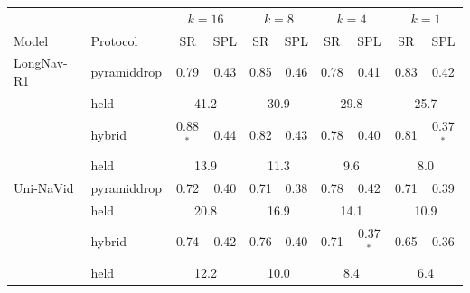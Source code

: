 \begin{tabular}{llcccccccc}
\toprule
 & & \multicolumn{2}{c}{$k=16$} & \multicolumn{2}{c}{$k=8$} & \multicolumn{2}{c}{$k=4$} & \multicolumn{2}{c}{$k=1$} \\
Model & Protocol & SR & SPL & SR & SPL & SR & SPL & SR & SPL \\
\midrule
LongNav-R1 & pyramiddrop & 0.79 & 0.43 & 0.85 & 0.46 & 0.78 & 0.41 & 0.83 & 0.42 \\
 & \quad held & \multicolumn{2}{c}{41.2} & \multicolumn{2}{c}{30.9} & \multicolumn{2}{c}{29.8} & \multicolumn{2}{c}{25.7} \\
 & hybrid & 0.88$^{*}$ & 0.44 & 0.82 & 0.43 & 0.78 & 0.40 & 0.81 & 0.37$^{*}$ \\
 & \quad held & \multicolumn{2}{c}{13.9} & \multicolumn{2}{c}{11.3} & \multicolumn{2}{c}{9.6} & \multicolumn{2}{c}{8.0} \\
\midrule
Uni-NaVid & pyramiddrop & 0.72 & 0.40 & 0.71 & 0.38 & 0.78 & 0.42 & 0.71 & 0.39 \\
 & \quad held & \multicolumn{2}{c}{20.8} & \multicolumn{2}{c}{16.9} & \multicolumn{2}{c}{14.1} & \multicolumn{2}{c}{10.9} \\
 & hybrid & 0.74 & 0.42 & 0.76 & 0.40 & 0.71 & 0.37$^{*}$ & 0.65 & 0.36 \\
 & \quad held & \multicolumn{2}{c}{12.2} & \multicolumn{2}{c}{10.0} & \multicolumn{2}{c}{8.4} & \multicolumn{2}{c}{6.4} \\
\bottomrule
\end{tabular}
